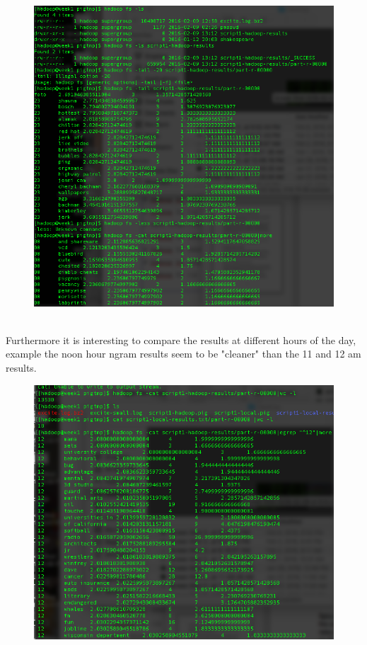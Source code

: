 \documentclass[10pt]{article}
\begin{document}
\begin{figure}[!h]
\includegraphics[scale=0.37]{hadoop_output2.png}
\centering
\end{figure}\\
\indent Furthermore it is interesting to compare the results at different hours of the day, example the noon hour ngram results seem to be "cleaner" than the 11 and 12 am results.
\pagebreak
\begin{figure}[!h]
\includegraphics[scale=0.37]{noon.png}
\centering
\end{figure}\\
\end{document}
